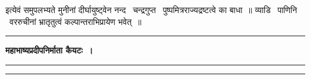 \documentclass[11pt, openany]{book}
\begin{document}
इत्येवं समुपलभ्यते मुनीनां दीर्घायुष्ट्वेन नन्द \textendash\ चन्द्रगुप्त \textendash\ पुष्पमित्रराज्यद्रष्टत्वे का बाधा~॥ व्याडि \textendash\ पाणिनि \textendash\ वररुचीनां भ्रातृतुत्वं कल्पान्तराभिप्रायेण भवेत्~॥ 

\vspace{3cm}
\begin{center}
\rule{0.1\linewidth}{0.5pt}
\end{center}

\newpage
\thispagestyle{empty}
\begin{center}
\textbf{\Large महाभाष्यप्रदीपनिर्माता कैयटः~।}\\
\rule{0.2\linewidth}{0.5pt}
\end{center}

\noindent
\rule{1\linewidth}{0.5pt}\\
\end{document}
